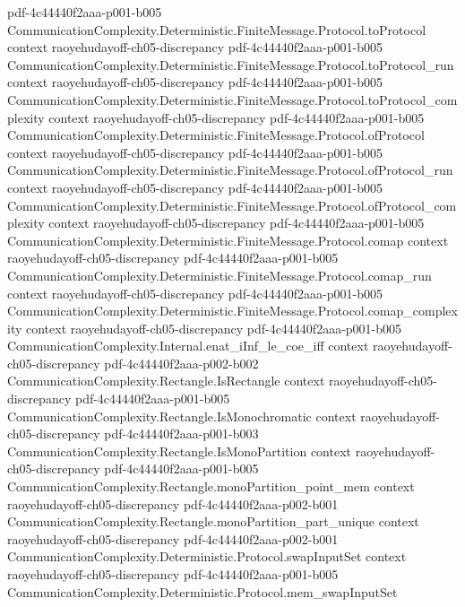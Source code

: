 \begin{lemma}
  {pdf-4c44440f2aaa-p001-b005}
\proofstep
  {CommunicationComplexity.Deterministic.FiniteMessage.Protocol.toProtocol}
  {context}
  {raoyehudayoff-ch05-discrepancy}
  {pdf-4c44440f2aaa-p001-b005}
\proofstep
  {CommunicationComplexity.Deterministic.FiniteMessage.Protocol.toProtocol_run}
  {context}
  {raoyehudayoff-ch05-discrepancy}
  {pdf-4c44440f2aaa-p001-b005}
\proofstep
  {CommunicationComplexity.Deterministic.FiniteMessage.Protocol.toProtocol_complexity}
  {context}
  {raoyehudayoff-ch05-discrepancy}
  {pdf-4c44440f2aaa-p001-b005}
\proofstep
  {CommunicationComplexity.Deterministic.FiniteMessage.Protocol.ofProtocol}
  {context}
  {raoyehudayoff-ch05-discrepancy}
  {pdf-4c44440f2aaa-p001-b005}
\proofstep
  {CommunicationComplexity.Deterministic.FiniteMessage.Protocol.ofProtocol_run}
  {context}
  {raoyehudayoff-ch05-discrepancy}
  {pdf-4c44440f2aaa-p001-b005}
\proofstep
  {CommunicationComplexity.Deterministic.FiniteMessage.Protocol.ofProtocol_complexity}
  {context}
  {raoyehudayoff-ch05-discrepancy}
  {pdf-4c44440f2aaa-p001-b005}
\proofstep
  {CommunicationComplexity.Deterministic.FiniteMessage.Protocol.comap}
  {context}
  {raoyehudayoff-ch05-discrepancy}
  {pdf-4c44440f2aaa-p001-b005}
\proofstep
  {CommunicationComplexity.Deterministic.FiniteMessage.Protocol.comap_run}
  {context}
  {raoyehudayoff-ch05-discrepancy}
  {pdf-4c44440f2aaa-p001-b005}
\proofstep
  {CommunicationComplexity.Deterministic.FiniteMessage.Protocol.comap_complexity}
  {context}
  {raoyehudayoff-ch05-discrepancy}
  {pdf-4c44440f2aaa-p001-b005}
\proofstep
  {CommunicationComplexity.Internal.enat_iInf_le_coe_iff}
  {context}
  {raoyehudayoff-ch05-discrepancy}
  {pdf-4c44440f2aaa-p002-b002}
\proofstep
  {CommunicationComplexity.Rectangle.IsRectangle}
  {context}
  {raoyehudayoff-ch05-discrepancy}
  {pdf-4c44440f2aaa-p001-b005}
\proofstep
  {CommunicationComplexity.Rectangle.IsMonochromatic}
  {context}
  {raoyehudayoff-ch05-discrepancy}
  {pdf-4c44440f2aaa-p001-b003}
\proofstep
  {CommunicationComplexity.Rectangle.IsMonoPartition}
  {context}
  {raoyehudayoff-ch05-discrepancy}
  {pdf-4c44440f2aaa-p001-b005}
\proofstep
  {CommunicationComplexity.Rectangle.monoPartition_point_mem}
  {context}
  {raoyehudayoff-ch05-discrepancy}
  {pdf-4c44440f2aaa-p002-b001}
\proofstep
  {CommunicationComplexity.Rectangle.monoPartition_part_unique}
  {context}
  {raoyehudayoff-ch05-discrepancy}
  {pdf-4c44440f2aaa-p002-b001}
\proofstep
  {CommunicationComplexity.Deterministic.Protocol.swapInputSet}
  {context}
  {raoyehudayoff-ch05-discrepancy}
  {pdf-4c44440f2aaa-p001-b005}
\proofstep
  {CommunicationComplexity.Deterministic.Protocol.mem_swapInputSet}

\end{lemma}
